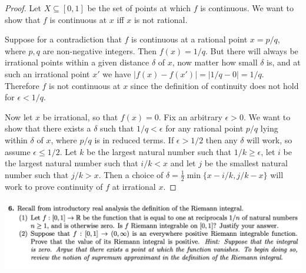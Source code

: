\begin{proof}
  Let $X \subseteq [0, 1]$ be the set of points at which $f$ is continuous. We want to show that $f$ is
  continuous at $x$ iff $x$ is not rational.

  Suppose for a contradiction that $f$ is continuous at a rational point $x = p/q$, where $p, q$ are
  non-negative integers. Then $f(x) = 1/q$. But there will always be irrational points within a given
  distance $\delta$ of $x$, now matter how small $\delta$ is, and at such an irrational point $x'$ we
  have $|f(x) - f(x')| = |1/q - 0| = 1/q$. Therefore $f$ is not continuous at $x$ since the definition of
  continuity does not hold for $\epsilon < 1/q$.

  Now let $x$ be irrational, so that $f(x) = 0$. Fix an arbitrary $\epsilon > 0$. We want to show that there
  exists a $\delta$ such that $1/q < \epsilon$ for any rational point $p/q$ lying within $\delta$ of $x$,
  where $p/q$ is in reduced terms. If $\epsilon > 1/2$ then any $\delta$ will work, so
  assume $\epsilon \leq 1/2$. Let $k$ be the largest natural number such that $1/k \geq \epsilon$, let $i$ be
  the largest natural number such that $i/k < x$ and let $j$ be the smallest natural number such
  that $j/k > x$. Then a choice of $\delta = \frac{1}{2}\min\{x - i/k, j/k - x\}$ will work to prove continuity
  of $f$ at irrational $x$.
\end{proof}

\includegraphics[width=400pt]{img/analysis--berkeley-202a--homework-1-f5e8.png}


